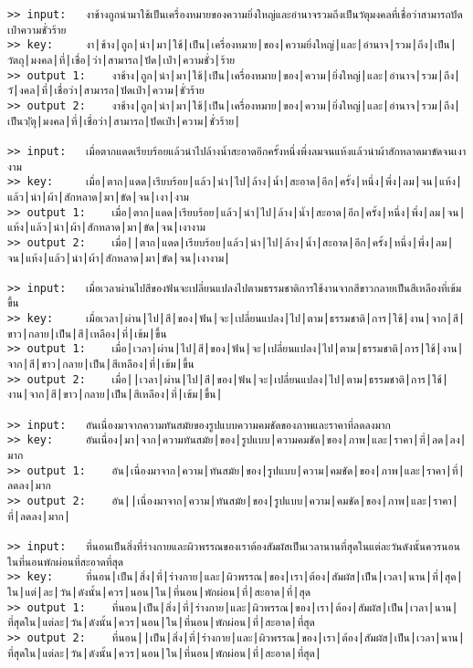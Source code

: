 \documentclass[11pt]{article}
\begin{document}
\begin{Verbatim}[commandchars=\\\{\}]
>> input:	งาช้างถูกนำมาใช้เป็นเครื่องหมายของความยิ่งใหญ่และอำนาจรวมถึงเป็นวัตุมงคลที่เชื่อว่าสามารถปัดเป่าความชั่วร้าย
>> key:		งา|ช้าง|ถูก|นำ|มา|ใช้|เป็น|เครื่องหมาย|ของ|ความยิ่งใหญ่|และ|อำนาจ|รวม|ถึง|เป็น|วัตถุ|มงคล|ที่|เชื่อ|ว่า|สามารถ|ปัด|เป่า|ความชั่ว|ร้าย
>> output 1:	งาช้าง|ถูก|นำ|มา|ใช้|เป็น|เครื่องหมาย|ของ|ความ|ยิ่งใหญ่|และ|อำนาจ|รวม|ถึง|วั|งคล|ที่|เชื่อว่า|สามารถ|ปัดเป่า|ความ|ชั่วร้าย
>> output 2:	งาช้าง|ถูก|นำ|มา|ใช้|เป็น|เครื่องหมาย|ของ|ความ|ยิ่งใหญ่|และ|อำนาจ|รวม|ถึง|เป็นว|ัตุ|มงคล|ที่|เชื่อว่า|สามารถ|ปัดเป่า|ความ|ชั่วร้าย|

>> input:	เมื่อตากแดดเรียบร้อยแล้วนำไปล้างน้ำสะอาดอีกครั้งหนึ่งพึ่งลมจนแห้งแล้วนำผ้าสักหลาดมาขัดจนเงางาม
>> key:		เมื่อ|ตาก|แดด|เรียบร้อย|แล้ว|นำ|ไป|ล้าง|น้ำ|สะอาด|อีก|ครั้ง|หนึ่ง|พึ่ง|ลม|จน|แห้ง|แล้ว|นำ|ผ้า|สักหลาด|มา|ขัด|จน|เงา|งาม
>> output 1:	เมื่อ|ตาก|แดด|เรียบร้อย|แล้ว|นำ|ไป|ล้าง|น้ำ|สะอาด|อีก|ครั้ง|หนึ่ง|พึ่ง|ลม|จน|แห้ง|แล้ว|นำ|ผ้า|สักหลาด|มา|ขัด|จน|เงางาม
>> output 2:	เมื่อ||ตาก|แดด|เรียบร้อย|แล้ว|นำ|ไป|ล้าง|น้ำ|สะอาด|อีก|ครั้ง|หนึ่ง|พึ่ง|ลม|จน|แห้ง|แล้ว|นำ|ผ้า|สักหลาด|มา|ขัด|จน|เงางาม|

>> input:	เมื่อเวลาผ่านไปสีของฟันจะเปลี่ยนแปลงไปตามธรรมชาติการใช้งานจากสีขาวกลายเป็นสีเหลืองที่เข้มขึ้น
>> key:		เมื่อเวลา|ผ่าน|ไป|สี|ของ|ฟัน|จะ|เปลี่ยนแปลง|ไป|ตาม|ธรรมชาติ|การ|ใช้|งาน|จาก|สี|ขาว|กลาย|เป็น|สี|เหลือง|ที่|เข้ม|ขึ้น
>> output 1:	เมื่อ|เวลา|ผ่าน|ไป|สี|ของ|ฟัน|จะ|เปลี่ยนแปลง|ไป|ตาม|ธรรมชาติ|การ|ใช้|งาน|จาก|สี|ขาว|กลาย|เป็น|สีเหลือง|ที่|เข้ม|ขึ้น
>> output 2:	เมื่อ||เวลา|ผ่าน|ไป|สี|ของ|ฟัน|จะ|เปลี่ยนแปลง|ไป|ตาม|ธรรมชาติ|การ|ใช้|งาน|จาก|สี|ขาว|กลาย|เป็น|สีเหลือง|ที่|เข้ม|ขึ้น|

>> input:	อันเนื่องมาจากความทันสมัยของรูปแบบความคมชัดของภาพและราคาที่ลดลงมาก
>> key:		อันเนื่อง|มา|จาก|ความทันสมัย|ของ|รูปแบบ|ความคมชัด|ของ|ภาพ|และ|ราคา|ที่|ลด|ลง|มาก
>> output 1:	อัน|เนื่องมาจาก|ความ|ทันสมัย|ของ|รูปแบบ|ความ|คมชัด|ของ|ภาพ|และ|ราคา|ที่|ลดลง|มาก
>> output 2:	อัน||เนื่องมาจาก|ความ|ทันสมัย|ของ|รูปแบบ|ความ|คมชัด|ของ|ภาพ|และ|ราคา|ที่|ลดลง|มาก|

>> input:	ที่นอนเป็นสิ่งที่ร่างกายและผิวพรรณของเราต้องสัมผัสเป็นเวลานานที่สุดในแต่ละวันดังนั้นควรนอนในที่นอนพักผ่อนที่สะอาดที่สุด
>> key:		ที่นอน|เป็น|สิ่ง|ที่|ร่างกาย|และ|ผิวพรรณ|ของ|เรา|ต้อง|สัมผัส|เป็น|เวลา|นาน|ที่|สุด|ใน|แต่|ละ|วัน|ดังนั้น|ควร|นอน|ใน|ที่นอน|พักผ่อน|ที่|สะอาด|ที่|สุด
>> output 1:	ที่นอน|เป็น|สิ่ง|ที่|ร่างกาย|และ|ผิวพรรณ|ของ|เรา|ต้อง|สัมผัส|เป็น|เวลา|นาน|ที่สุดใน|แต่ละ|วัน|ดังนั้น|ควร|นอน|ใน|ที่นอน|พักผ่อน|ที่|สะอาด|ที่สุด
>> output 2:	ที่นอน||เป็น|สิ่ง|ที่|ร่างกาย|และ|ผิวพรรณ|ของ|เรา|ต้อง|สัมผัส|เป็น|เวลา|นาน|ที่สุดใน|แต่ละ|วัน|ดังนั้น|ควร|นอน|ใน|ที่นอน|พักผ่อน|ที่|สะอาด|ที่สุด|


\end{Verbatim}
\end{document}
